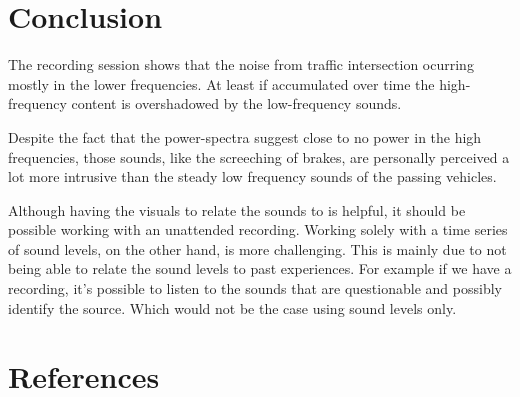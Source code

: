 \documentclass[twocolumn]{article}
\begin{document}
\section{Conclusion}
The recording session shows that the noise from traffic intersection ocurring mostly in the lower
frequencies.
At least if accumulated over time the high-frequency content is overshadowed by the low-frequency sounds.

Despite the fact that the power-spectra suggest close to no power in the high frequencies,
those sounds, like the screeching of brakes, are personally perceived a lot more intrusive than the steady
low frequency sounds of the passing vehicles.

Although having the visuals to relate the sounds to is helpful, it should be possible working with an
unattended recording.
Working solely with a time series of sound levels, on the other hand, is more challenging.
This is mainly due to not being able to relate the sound levels to past experiences.
For example if we have a recording, it's possible to listen to the sounds that are
questionable and possibly identify the source.
Which would not be the case using sound levels only.

\section{References}
\end{document}

